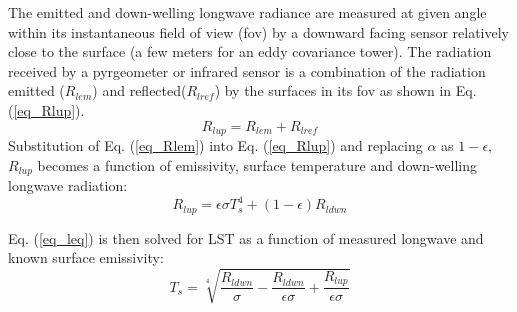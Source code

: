 \documentclass[fleqn,10pt]{wlscirep}
\begin{document}
The emitted and down-welling longwave radiance are measured at given angle within its instantaneous field of view (fov) by a downward facing sensor relatively close to the surface (a few meters for an eddy covariance tower). The radiation received by a pyrgeometer or infrared sensor is a combination of the radiation emitted ($R_{lem}$) and reflected($R_{lref}$) by the surfaces in its fov as shown in Eq. (\ref{eq_Rlup}). 
\begin{equation}\label{eq_Rlup}
R_{lup} = R_{lem} + R_{lref}
\end{equation}
Substitution of Eq. (\ref{eq_Rlem}) into Eq. (\ref{eq_Rlup}) and replacing  $\alpha$ as $1 - \epsilon$, $R_{lup}$ becomes a function of emissivity, surface temperature and down-welling longwave radiation:
\begin{equation}\label{eq_leq}
R_{lup}= \epsilon \sigma T_{s}^{4} + (1- \epsilon)R_{ldwn}
\end{equation}

Eq. (\ref{eq_leq}) is then solved for LST as a function of measured longwave and known surface emissivity:
\begin{equation}\label{eq_Tleq}
T_{s} = \sqrt[4]{\frac{R_{ldwn}}{\sigma} - \frac{R_{ldwn}}{\epsilon \sigma} + \frac{R_{lup}}{\epsilon \sigma}}
\end{equation}
\end{document}
